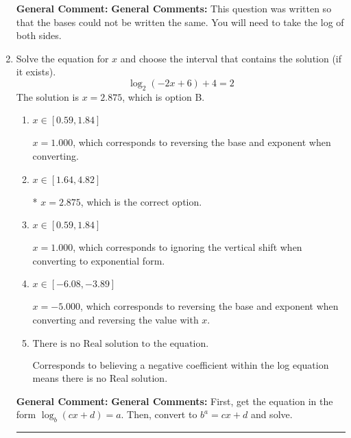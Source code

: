 \documentclass{extbook}[14pt]
\newcommand{\litem}[1]{\item #1

\rule{\textwidth}{0.4pt}}
\begin{document}
\begin{enumerate}
{\textbf{General Comment:} \textbf{General Comments:} This question was written so that the bases could not be written the same. You will need to take the log of both sides.
}
\litem{
Solve the equation for $x$ and choose the interval that contains the solution (if it exists).
\[ \log_{2}{(-2x+6)}+4 = 2 \]The solution is \( x = 2.875 \), which is option B.\begin{enumerate}[label=\Alph*.]
\item \( x \in [0.59, 1.84] \)

$x = 1.000$, which corresponds to reversing the base and exponent when converting.
\item \( x \in [1.64, 4.82] \)

* $x = 2.875$, which is the correct option.
\item \( x \in [0.59, 1.84] \)

$x = 1.000$, which corresponds to ignoring the vertical shift when converting to exponential form.
\item \( x \in [-6.08, -3.89] \)

$x = -5.000$, which corresponds to reversing the base and exponent when converting and reversing the value with $x$.
\item \( \text{There is no Real solution to the equation.} \)

Corresponds to believing a negative coefficient within the log equation means there is no Real solution.
\end{enumerate}

\textbf{General Comment:} \textbf{General Comments:} First, get the equation in the form $\log_b{(cx+d)} = a$. Then, convert to $b^a = cx+d$ and solve.
}
\end{enumerate}
\end{document}
